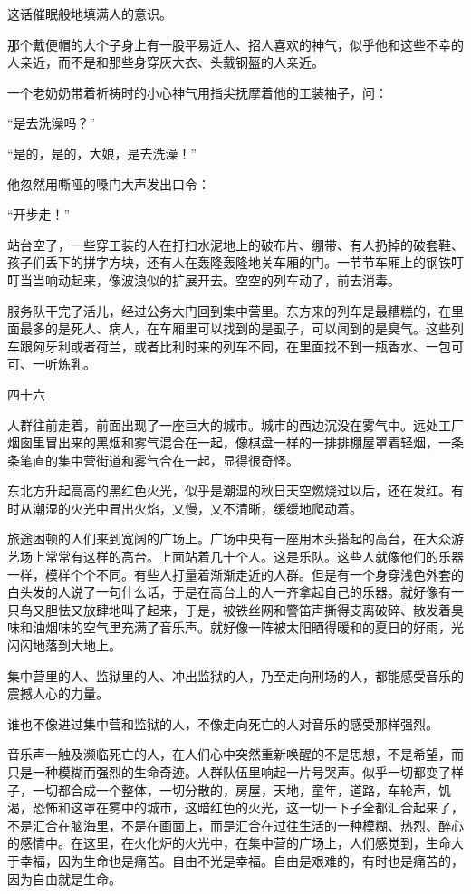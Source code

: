 这话催眠般地填满人的意识。

那个戴便帽的大个子身上有一股平易近人、招人喜欢的神气，似乎他和这些不幸的人亲近，而不是和那些身穿灰大衣、头戴钢盔的人亲近。

一个老奶奶带着祈祷时的小心神气用指尖抚摩着他的工装袖子，问：

“是去洗澡吗？”

“是的，是的，大娘，是去洗澡！”

他忽然用嘶哑的嗓门大声发出口令：

“开步走！”

站台空了，一些穿工装的人在打扫水泥地上的破布片、绷带、有人扔掉的破套鞋、孩子们丢下的拼字方块，还有人在轰隆轰隆地关车厢的门。一节节车厢上的钢铁叮叮当当响动起来，像波浪似的扩展开去。空空的列车动了，前去消毒。

服务队干完了活儿，经过公务大门回到集中营里。东方来的列车是最糟糕的，在里面最多的是死人、病人，在车厢里可以找到的是虱子，可以闻到的是臭气。这些列车跟匈牙利或者荷兰，或者比利时来的列车不同，在里面找不到一瓶香水、一包可可、一听炼乳。

四十六

人群往前走着，前面出现了一座巨大的城市。城市的西边沉没在雾气中。远处工厂烟囱里冒出来的黑烟和雾气混合在一起，像棋盘一样的一排排棚屋罩着轻烟，一条条笔直的集中营街道和雾气合在一起，显得很奇怪。

东北方升起高高的黑红色火光，似乎是潮湿的秋日天空燃烧过以后，还在发红。有时从潮湿的火光中冒出火焰，又慢，又不清晰，缓缓地爬动着。

旅途困顿的人们来到宽阔的广场上。广场中央有一座用木头搭起的高台，在大众游艺场上常常有这样的高台。上面站着几十个人。这是乐队。这些人就像他们的乐器一样，模样个个不同。有些人打量着渐渐走近的人群。但是有一个身穿浅色外套的白头发的人说了一句什么话，于是在高台上的人一齐拿起自己的乐器。就好像有一只鸟又胆怯又放肆地叫了起来，于是，被铁丝网和警笛声撕得支离破碎、散发着臭味和油烟味的空气里充满了音乐声。就好像一阵被太阳晒得暖和的夏日的好雨，光闪闪地落到大地上。

集中营里的人、监狱里的人、冲出监狱的人，乃至走向刑场的人，都能感受音乐的震撼人心的力量。

谁也不像进过集中营和监狱的人，不像走向死亡的人对音乐的感受那样强烈。

音乐声一触及濒临死亡的人，在人们心中突然重新唤醒的不是思想，不是希望，而只是一种模糊而强烈的生命奇迹。人群队伍里响起一片号哭声。似乎一切都变了样子，一切都合成一个整体，一切分散的，房屋，天地，童年，道路，车轮声，饥渴，恐怖和这罩在雾中的城市，这暗红色的火光，这一切一下子全都汇合起来了，不是汇合在脑海里，不是在画面上，而是汇合在过往生活的一种模糊、热烈、醉心的感情中。在这里，在火化炉的火光中，在集中营的广场上，人们感觉到，生命大于幸福，因为生命也是痛苦。自由不光是幸福。自由是艰难的，有时也是痛苦的，因为自由就是生命。

